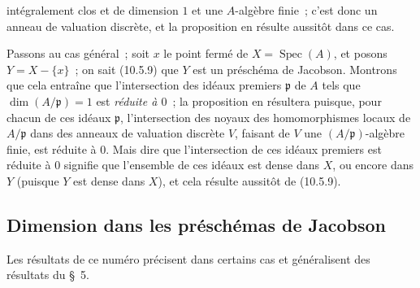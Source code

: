 intégralement clos et de dimension $1$ et une $A$-algèbre finie~; c'est donc
un anneau de valuation discrète, et la proposition en résulte aussitôt dans
ce cas.

Passons au cas général~; soit $x$ le point fermé de
$X=\operatorname{Spec}(A)$, et posons $Y=X-\{x\}$~; on sait (10.5.9) que $Y$
est un préschéma de Jacobson. Montrons que cela entraîne que l'intersection
des idéaux premiers $\mathfrak p$ de $A$ tels que
$\dim(A/\mathfrak p)=1$ est \emph{réduite à $0$}~; la proposition en résultera
puisque, pour chacun de ces idéaux $\mathfrak p$, l'intersection des noyaux des
homomorphismes locaux de $A/\mathfrak p$ dans des anneaux de valuation
discrète $V$, faisant de $V$ une $(A/\mathfrak p)$-algèbre finie, est réduite
à $0$. Mais dire que l'intersection de ces idéaux premiers est réduite à $0$
signifie que l'ensemble de ces idéaux est dense dans $X$, ou encore dans $Y$
(puisque $Y$ est dense dans $X$), et cela résulte aussitôt de (10.5.9).

\subsection{Dimension dans les préschémas de Jacobson}
\label{subsection:IV.10.6-fr}

Les résultats de ce numéro précisent dans certains cas et généralisent des résultats
du \S~5.

